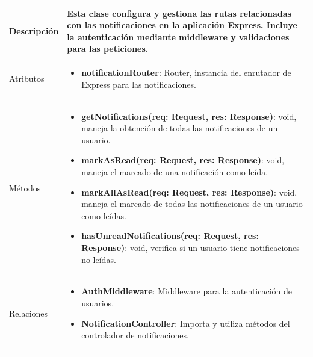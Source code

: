 \begin{longtable}{
    >{\columncolor{lightgreen!20}}p{4cm}
    p{12cm}
    }
    \midrule
    Descripción & Esta clase configura y gestiona las rutas relacionadas con las notificaciones en la aplicación Express. Incluye la autenticación mediante middleware y validaciones para las peticiones. \\
    \midrule
    Atributos & \begin{itemize}[nosep,leftmargin=*]
      \item \textbf{notificationRouter}: Router, instancia del enrutador de Express para las notificaciones.
    \end{itemize} \\
    \midrule
    Métodos & \begin{itemize}[nosep,leftmargin=*]
      \item \textbf{getNotifications(req: Request, res: Response)}: void, maneja la obtención de todas las notificaciones de un usuario.
      \item \textbf{markAsRead(req: Request, res: Response)}: void, maneja el marcado de una notificación como leída.
      \item \textbf{markAllAsRead(req: Request, res: Response)}: void, maneja el marcado de todas las notificaciones de un usuario como leídas.
      \item \textbf{hasUnreadNotifications(req: Request, res: Response)}: void, verifica si un usuario tiene notificaciones no leídas.
    \end{itemize} \\
    \midrule
    Relaciones & \begin{itemize}[nosep,leftmargin=*]
      \item \textbf{AuthMiddleware}: Middleware para la autenticación de usuarios.
      \item \textbf{NotificationController}: Importa y utiliza métodos del controlador de notificaciones.
    \end{itemize} \\
    \end{longtable}

